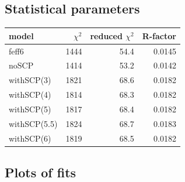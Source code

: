 \documentclass[11pt]{article}
\begin{document}
\subsection{Statistical parameters}
\label{sec:orgheadline3}

\begin{center}
  \begin{tabular}{lrrr}
    model & $\chi^2$ & reduced $\chi^2$ & R-factor\\
    \hline
    feff6        & 1444 & 54.4 & 0.0145\\
    noSCP        & 1414 & 53.2 & 0.0142\\
    withSCP(3)   & 1821 & 68.6 & 0.0182\\
    withSCP(4)   & 1814 & 68.3 & 0.0182\\
    withSCP(5)   & 1817 & 68.4 & 0.0182\\
    withSCP(5.5) & 1824 & 68.7 & 0.0183\\
    withSCP(6)   & 1819 & 68.5 & 0.0182\\
  \end{tabular}
\end{center}





\subsection{Plots of fits}
\label{sec:orgheadline5}
\end{document}
